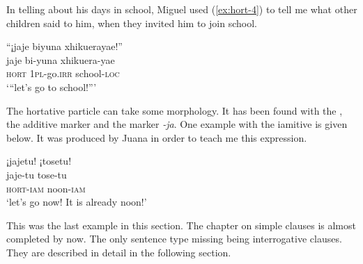 In telling about his days in school, Miguel used (\ref{ex:hort-4}) to tell me what other children said to him, when they invited him to join school.

\ea\label{ex:hort-4}
\begingl
\glpreamble “¡jaje biyuna xhikuerayae!”\\
\gla jaje bi-yuna xhikuera-yae\\
\glb \textsc{hort} 1\textsc{pl}-go.\textsc{irr} school-\textsc{loc}\\
\glft ‘“let’s go to school!”’
\endgl
\trailingcitation{[mxx-p181027l-1.006]}
\xe

The hortative particle can take some morphology. It has been found with the , the additive marker and the  marker \textit{-ja}. One example with the iamitive is given below. It was produced by Juana in order to teach me this expression. 

\ea\label{ex:hort-5}
\begingl
\glpreamble ¡jajetu! ¡tosetu!\\
\gla jaje-tu tose-tu\\
\glb \textsc{hort}-\textsc{iam} noon-\textsc{iam}\\
\glft ‘let’s go now! It is already noon!’
\endgl
\trailingcitation{[jxx-e110923l-1.084]}
\xe

%

This was the last example in this section. The chapter on simple clauses is almost completed by now. The only sentence type missing being interrogative clauses. They are described in detail in the following section.
